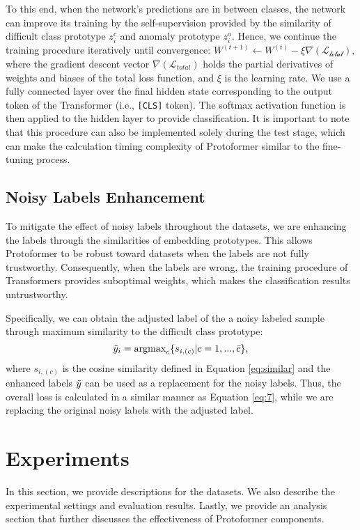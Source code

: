 \documentclass[letterpaper]{article} \usepackage{aaai22}  \usepackage{times}  \usepackage{helvet}  \usepackage{courier}  \usepackage{amsmath,amssymb}
\begin{document}
To this end, when the network's predictions are in between classes, the network can improve its training by the self-supervision provided by the similarity of difficult class prototype $z^{c}_{i}$ and anomaly prototype $z^{a}_{i}$. Hence, we continue the training procedure iteratively until convergence:
$
W^{(t+1)} \leftarrow W^{(t)}-\xi \nabla\left(\mathcal{\mathcal{L}_{\text{total}}}\right),
$
where the gradient descent vector $\nabla(\mathcal{L}_{total})$ holds the partial derivatives of weights and biases of the total loss function, and $\xi$ is the learning rate.
We use a fully connected layer over
the final hidden state corresponding to the output token of the Transformer (i.e., \texttt{[CLS]} token). The softmax activation function is then applied to the hidden layer to provide classification.
It is important to note that this procedure can also be implemented solely during the test stage, which can make the calculation timing complexity of Protoformer similar to the fine-tuning process.



\subsection{Noisy Labels Enhancement}
\label{sec:noisy}
To mitigate the effect of noisy labels throughout the datasets, we are enhancing the labels through the similarities of embedding prototypes. This allows Protoformer to be robust toward datasets when the labels are not fully trustworthy. Consequently, when the labels are wrong, the training procedure of Transformers provides suboptimal weights, which makes the classification results untrustworthy.

Specifically, we can obtain the adjusted label of the a noisy labeled sample through maximum similarity to the difficult class prototype:
\begin{equation}
 {\Tilde{y}_i}=\operatorname{argmax}_{c} \{s_{i,(c)}|c=1,...,\Bar{c}\},
\end{equation}
where $s_{i,(c)}$ is the cosine similarity defined in Equation
\eqref{eq:similar} and the enhanced labels $\Tilde{y}$ can be used as a replacement for the noisy labels. Thus, the overall loss is calculated in a similar manner as Equation \eqref{eq:7}, while we are replacing the original noisy labels with the adjusted label.


 \section{Experiments}
\label{section-experiment}
In this section, we provide descriptions for the datasets. We also describe the experimental settings and evaluation results. Lastly, we provide an analysis section that further discusses the effectiveness of Protoformer components.
\end{document}
